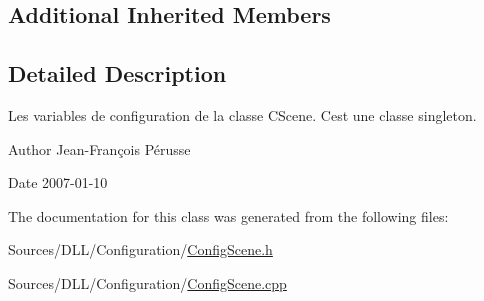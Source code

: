 \subsection*{Additional Inherited Members}


\subsection{Detailed Description}
Les variables de configuration de la classe C\+Scene. C\textquotesingle{}est une classe singleton. 

\begin{DoxyAuthor}{Author}
Jean-\/\+François Pérusse 
\end{DoxyAuthor}
\begin{DoxyDate}{Date}
2007-\/01-\/10 
\end{DoxyDate}


The documentation for this class was generated from the following files\+:\begin{DoxyCompactItemize}
\item 
Sources/\+D\+L\+L/\+Configuration/\hyperlink{_config_scene_8h}{Config\+Scene.\+h}\item 
Sources/\+D\+L\+L/\+Configuration/\hyperlink{_config_scene_8cpp}{Config\+Scene.\+cpp}\end{DoxyCompactItemize}
